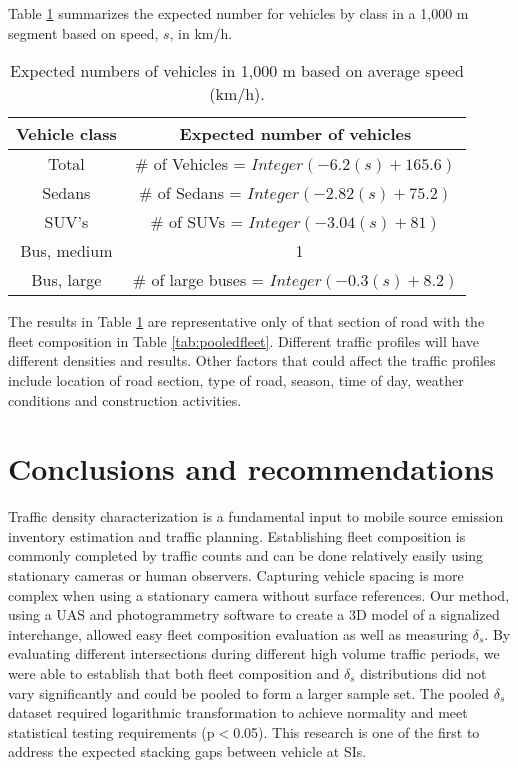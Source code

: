 \documentclass[preprint,12pt,a4paper]{elsarticle}
\begin{document}
\begin{linenumbers}
Table \ref{tb4:expectedvehicles} summarizes the expected number for vehicles by class in a 1,000 m segment based on speed, $s$, in km/h.
%
\begin{table}[H]
\centering
\caption{ Expected numbers of vehicles in 1,000 m based on average speed (km/h).}
\label{tb4:expectedvehicles}
\begin{tabular}{@{}cc@{}}
\toprule
\textbf{Vehicle class} & \textbf{Expected number of vehicles } \\ \midrule
Total & \# of Vehicles = $Integer(-6.2(s) + 165.6)$ \\
Sedans & \# of Sedans = $Integer (-2.82(s) + 75.2)$ \\
SUV's & \# of SUVs = $Integer (-3.04(s) + 81)$ \\
Bus, medium & \ 1 \\
Bus, large & \# of large buses = $Integer (-0.3(s) + 8.2)$ \\ \bottomrule
\end{tabular}
\end{table}
%
The results in Table \ref{tb4:expectedvehicles} are representative only of that section of road with the fleet composition in Table \ref{tab:pooledfleet}.  Different traffic profiles will have different densities and results.  Other factors that could affect the traffic profiles include location of road section, type of road, season, time of day, weather conditions and construction activities. 
 
\section{Conclusions and recommendations}
Traffic density characterization is a fundamental input to mobile source emission inventory estimation and traffic planning. Establishing fleet composition is commonly completed by traffic counts and can be done relatively easily using stationary cameras or human observers. Capturing vehicle spacing is more complex when using a stationary camera without surface references. Our method, using a UAS and photogrammetry software to create a 3D model of a signalized interchange, allowed easy fleet composition evaluation as well as measuring $\delta_{s}$. By evaluating different intersections during different high volume traffic periods, we were able to establish that both fleet composition and $\delta_{s}$ distributions did not vary significantly and could be pooled to form a larger sample set. The pooled $\delta_{s}$ dataset required logarithmic transformation to achieve normality and meet statistical testing requirements (p$<$0.05). This research is one of the first to address the expected stacking gaps between vehicle at SIs.


\end{linenumbers}
\end{document}
